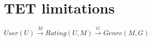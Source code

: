 \section{TET limitations}
$User(U)  \stackrel{M}{\longrightarrow} Rating(U,M) \stackrel{G}{\longrightarrow} Genre(M,G)$
